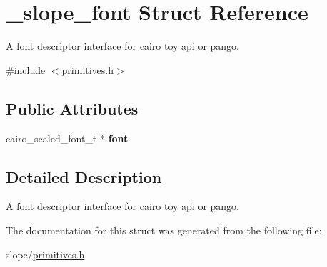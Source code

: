 \hypertarget{struct__slope__font}{\section{\+\_\+slope\+\_\+font Struct Reference}
\label{struct__slope__font}
}


A font descriptor interface for cairo toy api or pango.  




{\ttfamily \#include $<$primitives.\+h$>$}

\subsection*{Public Attributes}
\begin{DoxyCompactItemize}
\item 
\hypertarget{struct__slope__font_a2df0c59afeb530e3309fe3e3a45aa800}{cairo\+\_\+scaled\+\_\+font\+\_\+t $\ast$ {\bfseries font}}\label{struct__slope__font_a2df0c59afeb530e3309fe3e3a45aa800}

\end{DoxyCompactItemize}


\subsection{Detailed Description}
A font descriptor interface for cairo toy api or pango. 

The documentation for this struct was generated from the following file\+:\begin{DoxyCompactItemize}
\item 
slope/\hyperlink{primitives_8h}{primitives.\+h}\end{DoxyCompactItemize}
